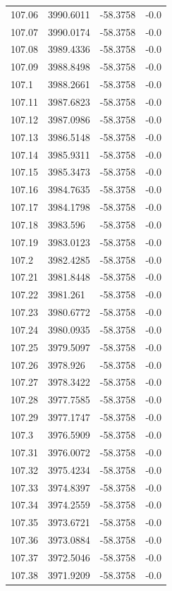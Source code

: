 \begin{table}[H]
\begin{tabular}{llll}
107.06 & 3990.6011 & -58.3758 & -0.0 \\
107.07 & 3990.0174 & -58.3758 & -0.0 \\
107.08 & 3989.4336 & -58.3758 & -0.0 \\
107.09 & 3988.8498 & -58.3758 & -0.0 \\
107.1 & 3988.2661 & -58.3758 & -0.0 \\
107.11 & 3987.6823 & -58.3758 & -0.0 \\
107.12 & 3987.0986 & -58.3758 & -0.0 \\
107.13 & 3986.5148 & -58.3758 & -0.0 \\
107.14 & 3985.9311 & -58.3758 & -0.0 \\
107.15 & 3985.3473 & -58.3758 & -0.0 \\
107.16 & 3984.7635 & -58.3758 & -0.0 \\
107.17 & 3984.1798 & -58.3758 & -0.0 \\
107.18 & 3983.596 & -58.3758 & -0.0 \\
107.19 & 3983.0123 & -58.3758 & -0.0 \\
107.2 & 3982.4285 & -58.3758 & -0.0 \\
107.21 & 3981.8448 & -58.3758 & -0.0 \\
107.22 & 3981.261 & -58.3758 & -0.0 \\
107.23 & 3980.6772 & -58.3758 & -0.0 \\
107.24 & 3980.0935 & -58.3758 & -0.0 \\
107.25 & 3979.5097 & -58.3758 & -0.0 \\
107.26 & 3978.926 & -58.3758 & -0.0 \\
107.27 & 3978.3422 & -58.3758 & -0.0 \\
107.28 & 3977.7585 & -58.3758 & -0.0 \\
107.29 & 3977.1747 & -58.3758 & -0.0 \\
107.3 & 3976.5909 & -58.3758 & -0.0 \\
107.31 & 3976.0072 & -58.3758 & -0.0 \\
107.32 & 3975.4234 & -58.3758 & -0.0 \\
107.33 & 3974.8397 & -58.3758 & -0.0 \\
107.34 & 3974.2559 & -58.3758 & -0.0 \\
107.35 & 3973.6721 & -58.3758 & -0.0 \\
107.36 & 3973.0884 & -58.3758 & -0.0 \\
107.37 & 3972.5046 & -58.3758 & -0.0 \\
107.38 & 3971.9209 & -58.3758 & -0.0 \\

\end{tabular}
\end{table}
